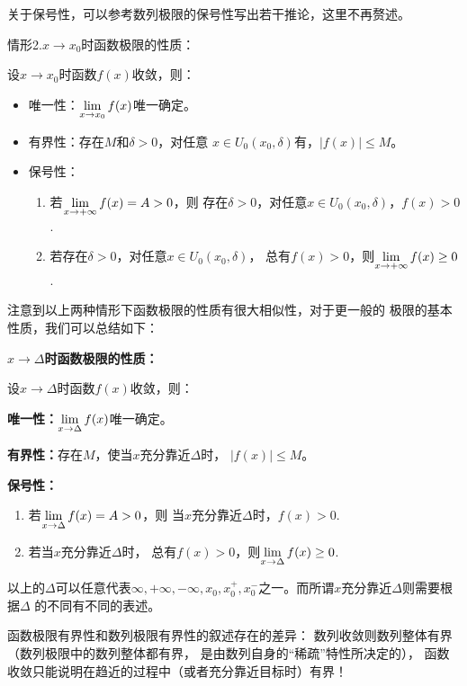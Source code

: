 关于保号性，可以参考数列极限的保号性写出若干推论，这里不再赘述。

{\kaishu 情形2.}$x\to x_0$时函数极限的性质：

设$x\to x_0$时函数$f(x)$收敛，则：
\begin{itemize}
	\setlength{\itemindent}{1cm}
	\item {\kaishu 唯一性：}$\lim\limits_{x\to{x_0}}f(x)$唯一确定。
	\item {\kaishu 有界性：}存在$M$和$\delta>0$，对任意
	$x\in U_0(x_0,\delta)$有，$|f(x)|\leq M$。
	\item {\kaishu 保号性：}
	\begin{enumerate}[(1)]
		\setlength{\itemindent}{1cm}
		\item 若$\lim\limits_{x\to{+\infty}}f(x)=A>0$，则
		存在$\delta>0$，对任意$x\in U_0(x_0,\delta)$，$f(x)>0$.
		\item 若存在$\delta>0$，对任意$x\in U_0(x_0,\delta)$，
		总有$f(x)>0$，则$\lim\limits_{x\to{+\infty}}f(x)\geq 0$.
	\end{enumerate}
\end{itemize}

注意到以上两种情形下函数极限的性质有很大相似性，对于更一般的
极限的基本性质，我们可以总结如下：

\begin{thx}
	{\bf $x\to\Delta$时函数极限的性质：}

	设$x\to\Delta$时函数$f(x)$收敛，则：
	
	{\bf 唯一性：}$\lim\limits_{x\to{\Delta}}f(x)$唯一确定。
	
	{\bf 有界性：}存在$M$，使当$x$充分靠近$\Delta$时，
	$|f(x)|\leq M$。
	
	{\bf 保号性：}
	\begin{enumerate}[(1)]
		\setlength{\itemindent}{1cm}
		\item 若$\lim\limits_{x\to{\Delta}}f(x)=A>0$，则
		当$x$充分靠近$\Delta$时，$f(x)>0$.
		\item 若当$x$充分靠近$\Delta$时，
		总有$f(x)>0$，则$\lim\limits_{x\to{\Delta}}f(x)\geq 0$.
	\end{enumerate}
\end{thx}

以上的$\Delta$可以任意代表$\infty,+\infty,-\infty,x_0,x_0^+,
x_0^-$之一。而所谓{\kaishu $x$充分靠近$\Delta$}则需要根据$\Delta$
的不同有不同的表述。

函数极限有界性和数列极限有界性的叙述存在的差异：
数列收敛则数列整体有界（数列极限中的数列整体都有界，
是由数列自身的“稀疏”特性所决定的），
函数收敛只能说明在趋近的过程中（或者充分靠近目标时）有界！

